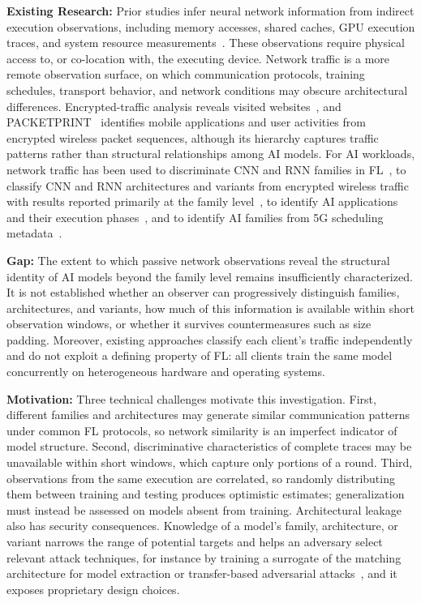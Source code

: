 \textbf{Existing Research:} Prior studies infer neural network information from
indirect execution observations, including memory accesses, shared caches, GPU
execution traces, and system resource
measurements~\cite{hua2018reverse,yan2020cache,hu2020deepsniffer,patwari2022dnn}.
These observations require physical access to, or co-location with, the
executing device. Network traffic is a more remote observation surface, on which
communication protocols, training schedules, transport behavior, and network
conditions may obscure architectural differences. Encrypted-traffic analysis
reveals visited
websites~\cite{panchenko2011website,wang2014effective,hayes2016kfingerprinting,sirinam2018deep},
and PACKETPRINT~\cite{li2022packet} identifies mobile applications and user
activities from encrypted wireless packet sequences, although its hierarchy
captures traffic patterns rather than structural relationships among AI models.
For AI workloads, network traffic has been used to discriminate CNN and RNN
families in FL~\cite{shuvo2025fingerprinting}, to classify CNN and RNN
architectures and variants from encrypted wireless traffic with results reported
primarily at the family level~\cite{shuvo2026flare}, to identify AI applications
and their execution phases~\cite{oyaniyi2026fingerprinting}, and to identify AI
families from 5G scheduling metadata~\cite{shuvo2026flint}.

\textbf{Gap:} The extent to which passive network observations reveal the
structural identity of AI models beyond the family level remains insufficiently
characterized. It is not established whether an observer can progressively
distinguish families, architectures, and variants, how much of this information
is available within short observation windows, or whether it survives
countermeasures such as size padding. Moreover, existing approaches classify each
client's traffic independently and do not exploit a defining property of FL:
all clients train the same model concurrently on heterogeneous hardware and
operating systems.

\textbf{Motivation:} Three technical challenges motivate this investigation.
First, different families and architectures may generate similar communication
patterns under common FL protocols, so network similarity is an imperfect
indicator of model structure. Second, discriminative characteristics of complete
traces may be unavailable within short windows, which capture only portions of a
round. Third, observations from the same execution are correlated, so randomly
distributing them between training and testing produces optimistic estimates;
generalization must instead be assessed on models absent from training.
Architectural leakage also has security consequences. Knowledge of a model's
family, architecture, or variant narrows the range of potential targets and
helps an adversary select relevant attack techniques, for instance by training a
surrogate of the matching architecture for model extraction or transfer-based
adversarial attacks~\cite{TODO-model-extraction}, and it exposes proprietary
design choices.

